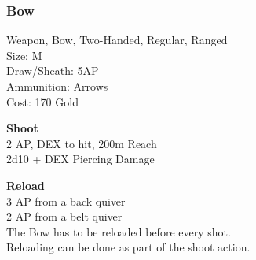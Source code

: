 \subsubsection{Bow}\label{weapon:bow}
Weapon, Bow, Two-Handed, Regular, Ranged\\
Size: M\\
Draw/Sheath: 5AP\\
Ammunition: Arrows\\
Cost: 170 Gold

\textbf{Shoot}\\
2 AP, DEX to hit, 200m Reach\\
2d10 + \texttimes DEX Piercing Damage

\textbf{Reload}\\
3 AP from a back quiver\\
2 AP from a belt quiver\\
The Bow has to be reloaded before every shot.\\
Reloading can be done as part of the shoot action.